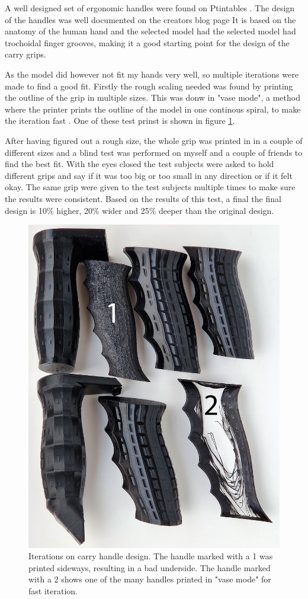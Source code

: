 A well designed set of ergonomic handles were found on Ptintables \cite{matulichErgonomicHandleBased}.
The design of the handles was well documented on the creators blog page \cite{matulichWhoseHandsAre2022}
It is based on the anatomy of the human hand and the selected model had the selected model had trochoidal finger grooves, making it a good starting point for the design of the carry grips.

As the model did however not fit my hands very well, so multiple iterations were made to find a good fit.
Firstly the rough scaling needed was found by printing the outline of the grip in multiple sizes.
This was donw in "vase mode", a method where the printer prints the outline of the model in one continous spiral, to make the iteration fast \cite{ghargeCuraVaseMode2022}. One of these test prinst is shown in figure \ref{fig:handle_iteration}.

After having figured out a rough size, the whole grip was printed in in a couple of different sizes and a blind test was performed on myself and a couple of friends to find the best fit.
With the eyes closed the test subjects were asked to hold different grips and say if it was too big or too small in any direction or if it felt okay.
The same grip were given to the test subjects multiple times to make sure the results were consistent.
Based on the results of this test, a final the final design is 10\% higher, 20\% wider and 25\% deeper than the original design.

\begin{figure}[H]
    \centering
    \includegraphics[width=.8\textwidth]{figures/3d_print/handles.png}
    \caption{Iterations on carry handle design. The handle marked with a 1 was printed sideways, resulting in a bad underside. The handle marked with a 2 shows one of the many handles printed in "vase mode" for fast iteration.}
    \label{fig:handle_iteration}
\end{figure}

